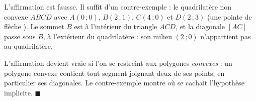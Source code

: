 L'affirmation est fausse. Il suffit d'un contre-exemple : le quadrilatère
non convexe $ABCD$ avec $A(0\,;0)$, $B(2\,;1)$, $C(4\,;0)$ et $D(2\,;3)$
(une \og pointe de flèche \fg). Le sommet $B$ est à l'intérieur du triangle
$ACD$, et la diagonale $[AC]$ passe sous $B$, à l'extérieur du quadrilatère :
son milieu $(2\,;0)$ n'appartient pas au quadrilatère.

L'affirmation devient vraie si l'on se restreint aux polygones
\emph{convexes} : un polygone convexe contient tout segment joignant deux de
ses points, en particulier ses diagonales. Le contre-exemple montre où se
cachait l'hypothèse implicite. \hfill $\blacksquare$
